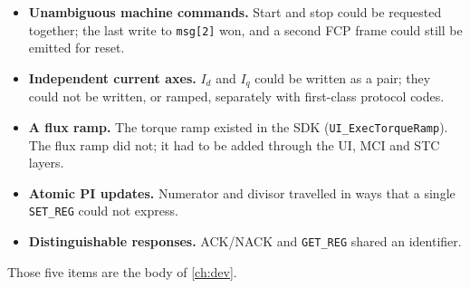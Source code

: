 \begin{itemize}[leftmargin=1.6em]
  \item \textbf{Unambiguous machine commands.} Start and stop could be
        requested together; the last write to \texttt{msg[2]} won, and a
        second FCP frame could still be emitted for reset.
  \item \textbf{Independent current axes.} $I_d$ and $I_q$ could be written
        as a pair; they could not be written, or ramped, separately with
        first-class protocol codes.
  \item \textbf{A flux ramp.} The torque ramp existed in the SDK
        (\texttt{UI\_ExecTorqueRamp}). The flux ramp did not; it had to be
        added through the UI, MCI and STC layers.
  \item \textbf{Atomic PI updates.} Numerator and divisor travelled in
        ways that a single \texttt{SET\_REG} could not express.
  \item \textbf{Distinguishable responses.} ACK/NACK and
        \texttt{GET\_REG} shared an identifier.
\end{itemize}

Those five items are the body of \cref{ch:dev}.
